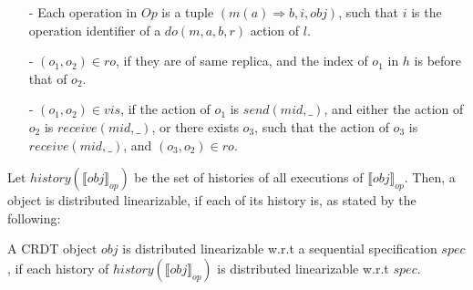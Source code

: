 \begin{itemize}
\setlength{\itemsep}{0.5pt}
\item[-] Each operation in $\mathit{Op}$ is a tuple $(m(a) \Rightarrow b,i,\mathit{obj})$, such that $i$ is the operation identifier of a $\mathit{do}(m,a,b,r)$ action of $l$.

\item[-] $(o_1,o_2) \in \mathit{ro}$, if they are of same replica, and the index of $o_1$ in $h$ is before that of $o_2$.

\item[-] $(o_1,o_2) \in \mathit{vis}$, if the action of $o_1$ is $\mathit{send}(\mathit{mid},\_)$, and either the action of $o_2$ is $\mathit{receive}(\mathit{mid},\_)$, or there exists $o_3$, such that the action of $o_3$ is $\mathit{receive}(\mathit{mid},\_)$, and $(o_3,o_2) \in \mathit{ro}$.
\end{itemize}

Let $\mathit{history}(\llbracket \mathit{obj} \rrbracket_{\mathit{op}})$ be the set of histories of all executions of $\llbracket \mathit{obj} \rrbracket_{\mathit{op}}$. Then, a object is distributed linearizable, if each of its history is, as stated by the following:

\begin{definition}
\label{definition:correctness of a CRDT object}
A CRDT object $\mathit{obj}$ is distributed linearizable w.r.t a sequential specification $\mathit{spec}$, if each history of $\mathit{history}(\llbracket \mathit{obj} \rrbracket_{\mathit{op}})$ is distributed linearizable w.r.t $\mathit{spec}$.
\end{definition}





















